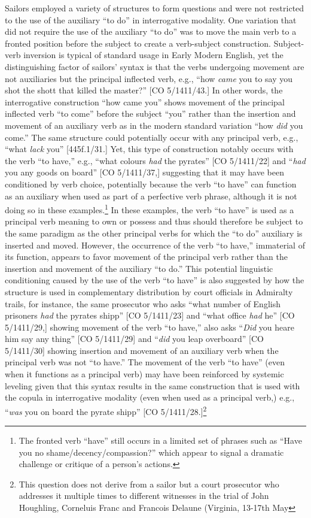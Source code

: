 \documentclass[12pt]{article}
\newenvironment{styleStandard}{\renewcommand\baselinestretch{1.0}\setlength\leftskip{0cm}\setlength\rightskip{0cm plus 1fil}\setlength\parindent{0cm}\setlength\parfillskip{0pt plus 1fil}\setlength\parskip{0in plus 1pt}\writerlistparindent\writerlistleftskip\leavevmode\normalfont\normalsize\writerlistlabel\ignorespaces}{\unskip\vspace{0in plus 1pt}\par}
\newcommand\writerlistleftskip{}
\newcommand\writerlistparindent{}
\newcommand\writerlistlabel{}
\begin{document}
\begin{styleStandard}
Sailors employed a variety of structures to form questions and were not restricted to the use of the auxiliary “to do” in interrogative modality. One variation that did not require the use of the auxiliary “to do” was to move the main verb to a fronted position before the subject to create a verb-subject construction. Subject-verb inversion is typical of standard usage in Early Modern English, yet the distinguishing factor of sailors’ syntax is that the verbs undergoing movement are not auxiliaries but the principal inflected verb, e.g., “how \textit{came} you to say you shot the shott that killed the master?” [CO 5/1411/43.] In other words, the interrogative construction “how came you” shows movement of the principal inflected verb “to come” before the subject “you” rather than the insertion and movement of an auxiliary verb as in the modern standard variation “how \textit{did }you come.” The same structure could potentially occur with any principal verb, e.g., “what \textit{lack} you” [445f.1/31.] Yet, this type of construction notably occurs with the verb “to have,” e.g., “what colours \textit{had} the pyrates” [CO 5/1411/22] and “\textit{had} you any goods on board” [CO 5/1411/37,] suggesting that it may have been conditioned by verb choice, potentially because the verb “to have” can function as an auxiliary when used as part of a perfective verb phrase, although it is not doing so in these examples.\footnote{ The fronted verb “have” still occurs in a limited set of phrases such as “Have you no shame/decency/compassion?” which appear to signal a dramatic challenge or critique of a person’s actions.} In these examples, the verb “to have” is used as a principal verb meaning to own or possess and thus should therefore be subject to the same paradigm as the other principal verbs for which the “to do” auxiliary is inserted and moved. However, the occurrence of the verb “to have,” immaterial of its function, appears to favor movement of the principal verb rather than the insertion and movement of the auxiliary “to do.” This potential linguistic conditioning caused by the use of the verb “to have” is also suggested by how the structure is used in complementary distribution by court officials in Admiralty trails, for instance, the same prosecutor who asks “what number of English prisoners\textit{ had} the pyrates shipp” [CO 5/1411/23] and “what office\textit{ had} he” [CO 5/1411/29,] showing movement of the verb “to have,” also asks “\textit{Did} you heare him say any thing” [CO 5/1411/29] and “\textit{did} you leap overboard” [CO 5/1411/30] showing insertion and movement of an auxiliary verb when the principal verb was not “to have.” The movement of the verb “to have” (even when it functions as a principal verb) may have been reinforced by systemic leveling given that this syntax results in the same construction that is used with the copula in interrogative modality (even when used as a principal verb,) e.g., “\textit{was} you on board the pyrate shipp” [CO 5/1411/28.]\footnote{ This question does not derive from a sailor but a court prosecutor who addresses it multiple times to different witnesses in the trial of John Houghling, Corneluis Franc and Francois Delaune (Virginia, 13-17th May 
\end{styleStandard}
\end{document}
